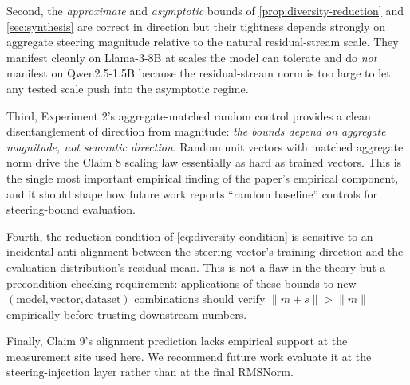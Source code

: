 Second, the \emph{approximate} and \emph{asymptotic} bounds of \ref{prop:diversity-reduction} and \ref{sec:synthesis} are correct in direction but their tightness depends strongly on aggregate steering magnitude relative to the natural residual-stream scale. They manifest cleanly on Llama-3-8B at scales the model can tolerate and do \emph{not} manifest on Qwen2.5-1.5B because the residual-stream norm is too large to let any tested scale push into the asymptotic regime.

Third, Experiment 2's aggregate-matched random control provides a clean disentanglement of direction from magnitude: \emph{the bounds depend on aggregate magnitude, not semantic direction}. Random unit vectors with matched aggregate norm drive the Claim 8 scaling law essentially as hard as trained vectors. This is the single most important empirical finding of the paper's empirical component, and it should shape how future work reports ``random baseline'' controls for steering-bound evaluation.

Fourth, the reduction condition of \ref{eq:diversity-condition} is sensitive to an incidental anti-alignment between the steering vector's training direction and the evaluation distribution's residual mean. This is not a flaw in the theory but a precondition-checking requirement: applications of these bounds to new $(\text{model}, \text{vector}, \text{dataset})$ combinations should verify $\|m+s\| > \|m\|$ empirically before trusting downstream numbers.

Finally, Claim 9's alignment prediction lacks empirical support at the measurement site used here. We recommend future work evaluate it at the steering-injection layer rather than at the final RMSNorm.
